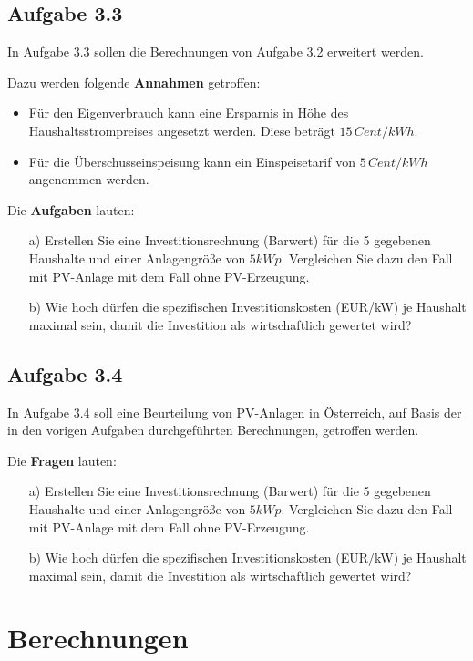 \documentclass[a4paper,12pt]{article}
\begin{document}
	\subsection{Aufgabe 3.3}
	In Aufgabe 3.3 sollen die Berechnungen von Aufgabe 3.2 erweitert werden.\\ \par
	\noindent Dazu werden folgende \textbf{Annahmen} getroffen:
	\begin{itemize}
		\item Für den Eigenverbrauch kann eine Ersparnis in Höhe des Haushaltsstrompreises angesetzt werden. Diese beträgt $15\,Cent/kWh$.
		\item Für die Überschusseinspeisung kann ein Einspeisetarif von $5\,Cent/kWh$ angenommen werden.
	\end{itemize}
	Die \textbf{Aufgaben} lauten:
	\begin{itemize}
		\item[a)] Erstellen Sie eine Investitionsrechnung (Barwert) für die 5 gegebenen Haushalte und einer Anlagengröße von $5kWp$. Vergleichen Sie dazu den Fall mit PV-Anlage mit dem Fall ohne PV-Erzeugung.
		\item[b)] Wie hoch dürfen die spezifischen Investitionskosten (EUR/kW) je Haushalt maximal sein, damit die Investition als wirtschaftlich gewertet wird?
	\end{itemize}
	\subsection{Aufgabe 3.4}
	In Aufgabe 3.4 soll eine Beurteilung von PV-Anlagen in Österreich, auf Basis der in den vorigen Aufgaben durchgeführten Berechnungen, getroffen werden.\\ \par
	\noindent Die \textbf{Fragen} lauten:
	\begin{itemize}
		\item[a)] Erstellen Sie eine Investitionsrechnung (Barwert) für die 5 gegebenen Haushalte und einer Anlagengröße von $5kWp$. Vergleichen Sie dazu den Fall mit PV-Anlage mit dem Fall ohne PV-Erzeugung.
		\item[b)] Wie hoch dürfen die spezifischen Investitionskosten (EUR/kW) je Haushalt maximal sein, damit die Investition als wirtschaftlich gewertet wird?
	\end{itemize}
	\newpage
	\section{Berechnungen}
	\label{sec:Berechnungen}
\end{document}
